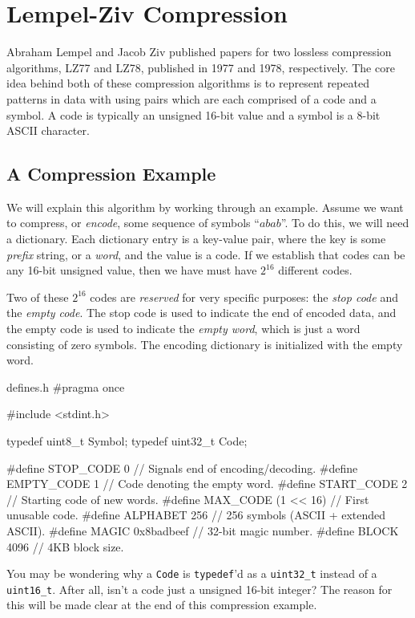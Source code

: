 \section{Lempel-Ziv Compression}\label{sec:lz78}

Abraham Lempel and Jacob Ziv published papers for two lossless compression
algorithms, LZ77 and LZ78, published in 1977 and 1978, respectively. The core
idea behind both of these compression algorithms is to represent repeated
patterns in data with using pairs which are each comprised of a code and a
symbol. A code is typically an unsigned 16-bit value and a symbol is a 8-bit
ASCII character.

\subsection{A Compression Example}

We will explain this algorithm by working through an example. Assume we want to
compress, or \emph{encode}, some sequence of symbols ``$abab$''. To do this, we
will need a dictionary. Each dictionary entry is a key-value pair, where the key
is some \emph{prefix} string, or a \emph{word}, and the value is a code. If we
establish that codes can be any 16-bit unsigned value, then we have must have
$2^{16}$ different codes.

Two of these $2^{16}$ codes are \emph{reserved} for very specific purposes: the
\emph{stop code} and the \emph{empty code}. The stop code is used to indicate
the end of encoded data, and the empty code is used to indicate the \emph{empty
word}, which is just a word consisting of zero symbols. The encoding dictionary
is initialized with the empty word.

\begin{clisting}{defines.h}
#pragma once

#include <stdint.h>

typedef uint8_t Symbol;
typedef uint32_t Code;

#define STOP_CODE  0          // Signals end of encoding/decoding.
#define EMPTY_CODE 1          // Code denoting the empty word.
#define START_CODE 2          // Starting code of new words.
#define MAX_CODE   (1 << 16)  // First unusable code.
#define ALPHABET   256        // 256 symbols (ASCII + extended ASCII).
#define MAGIC      0x8badbeef // 32-bit magic number.
#define BLOCK      4096       // 4KB block size.
\end{clisting}

You may be wondering why a \texttt{Code} is \texttt{typedef}'d as a
\texttt{uint32\_t} instead of a \texttt{uint16\_t}. After all, isn't a code just
a unsigned 16-bit integer? The reason for this will be made clear at the end of
this compression example.


